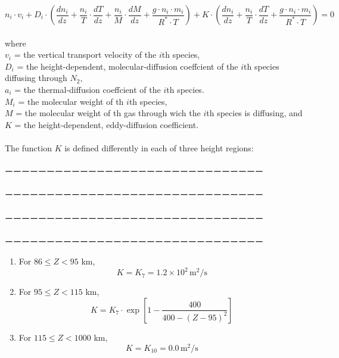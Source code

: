 \documentclass{article}
\begin{document}
\begin{equation}
  n_i \cdot v_i  + D_i \cdot \left ( \frac{dn_i}{dz} + \frac{n_i}{T} \cdot \frac{dT}{dz} + \frac{n_i}{M} \cdot \frac{dM}{dz}  + \frac{g \cdot n_i \cdot m_i}{R^* \cdot T}  \right ) + K \cdot \left ( \frac{dn_i}{dz} + \frac{n_i}{T} \cdot \frac{dT}{dz}  + \frac{g \cdot n_i \cdot m_i}{R^* \cdot T} \right ) = 0 \tag{6}
\end{equation}\\
where\\
$v_i$ = the vertical transport velocity of the $i$th species,\\
$D_i$ = the height-dependent, molecular-diffusion coeffcient of the $i$th species diffusing through $N_2$,\\
$a_i$ = the thermal-diffusion coeffcient of the $i$th species.\\
$M_i$ = the molecular weight of th $i$th species,\\
$M$ = the molecular weight of th gas through wich the $i$th species is diffusing, and\\
$K$ = the height-dependent, eddy-diffusion coefficient.\\
\\The function $K$ is defined differently in each of three height regions:\\
\\ーーーーーーーーーーーーーーーーーーーーーーーーーーーーーーー\\
\\ーーーーーーーーーーーーーーーーーーーーーーーーーーーーーーー\\
\\ーーーーーーーーーーーーーーーーーーーーーーーーーーーーーーー\\
\\ーーーーーーーーーーーーーーーーーーーーーーーーーーーーーーー\\
\begin{enumerate}
    \item For $86 \leq Z < 95$ km,
    \[
    K = K_7 = 1.2 \times 10^2 \, \text{m}^2/\text{s} \tag{7a}
    \]

    \item For $95 \leq Z < 115$ km,
    \[
    K = K_7 \cdot \exp\left[1 - \frac{400}{400 - (Z - 95)^2}\right] \tag{7b}
    \]

    \item For $115 \leq Z < 1000$ km,
    \[
    K = K_{10} = 0.0 \, \text{m}^2/\text{s} \tag{7c}
    \]
\end{enumerate}
\end{document}
